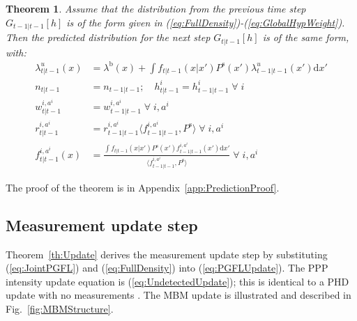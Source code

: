 \documentclass[journal,twoside]{IEEEtran}
\theoremstyle{plain}
\newtheorem{theorem}{Theorem}
\begin{document}
\begin{theorem}\label{th:Prediction}
Assume that the distribution from the previous time step $G_{t-1|t-1}[h]$ is of the form given in (\ref{eq:FullDensity})-(\ref{eq:GlobalHypWeight}). Then the predicted distribution for the next step $G_{t|t-1}[h]$ is of the same form, with:
%
{\allowdisplaybreaks \begin{align}
\lambda^u_{t|t-1}(x) &= \lambda^\mathrm{b}(x) + \int{f_{t|t-1}(x|x')P^{\mathrm{s}}(x')\lambda^u_{t-1|t-1}(x')\mathrm{d} x'}
\label{eq:UndetectedPropagation} \\
n_{t|t-1} &= n_{t-1|t-1}; \quad h^i_{t|t-1} = h^i_{t-1|t-1} \; \forall \; i \\
w_{t|t-1}^{i,a^i} &= w_{t-1|t-1}^{i,a^i} \; \forall \; i, a^i \\
r_{t|t-1}^{i,a^i} &= r_{t-1|t-1}^{i,a^i}\langle f_{t-1|t-1}^{i,a^i},P^{\mathrm{s}}\rangle \; \forall \; i, a^i \label{eq:ExistProbPropagation} \\
f_{t|t-1}^{i,a^i}(x) &= \frac{\int{f_{t|t-1}(x|x')P^{\mathrm{s}}(x')f_{t-1|t-1}^{i,a^i}(x')\mathrm{d} x'}}{\langle f_{t-1|t-1}^{i,a^i},P^{\mathrm{s}}\rangle}\; \forall \; i, a^i \label{eq:KinematicDistPropagation}
\end{align}}
\end{theorem}
%
The proof of the theorem is in Appendix~\ref{app:PredictionProof}. 


\vspace*{-9pt}


\subsection{Measurement update step}
\label{ss:UpdateDerivation}
%
Theorem~\ref{th:Update} derives the measurement update step by substituting (\ref{eq:JointPGFL}) and (\ref{eq:FullDensity}) into (\ref{eq:PGFLUpdate}). The PPP intensity update equation is (\ref{eq:UndetectedUpdate}); this is identical to a PHD update with no measurements \cite{Mah03,VoMa06}. The MBM update is illustrated and described in Fig.~\ref{fig:MBMStructure}.
\end{document}
